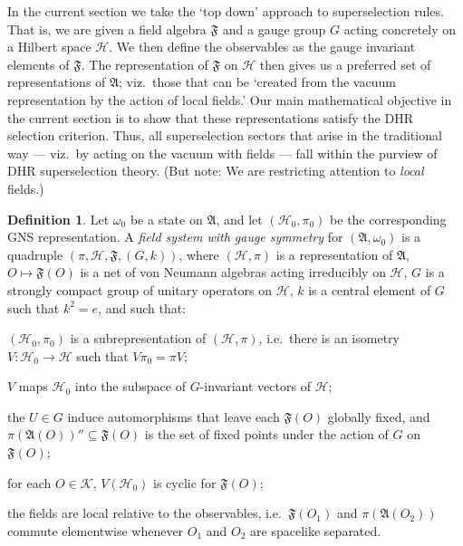 \documentclass[12pt]{article}
\makeatletter
\newenvironment{bxd}%
  {\bigskip\noindent\begin{Sbox}\begin{minipage}{0.9\textwidth} }%
  {\end{minipage}\end{Sbox}\fbox{\TheSbox}\bigskip}%
\newcommand{\alg}[1]{\mathfrak{#1}}
\theoremstyle{definition}
\theoremstyle{definition}
\newtheorem{defn}[thm]{Definition}
\theoremstyle{remark}
\def\2#1{{\mathcal #1}}
\def\al#1{{\mathfrak #1}}
\def\om{\omega} \def\Om{\Omega} \def\dd{\partial} \def\D{\Delta}
\def\@greek#1{%
 \ifcase#1\or$\alpha$\or$\beta$\or$\gamma$\or$\delta$\or$\varepsilon$%
  \or$\zeta$\or$\eta$\or$\vartheta$\or$\iota$\or$\kappa$\or$\lambda$\or$%
  \mu$\or$\nu$\or$\xi$\or$ o$\or$\varpi$\or$\varrho$\or$\varsigma$\or$\tau$%
  \or$\upsilon$\or$\varphi$\or$\chi$\or$\psi$\or$\omega$\else\@ctrerr\fi}
\def\greek#1{\@greek{\csname c@#1\endcsname}}
\newcounter{bean}
\newcommand{\fields}{(\pi ,\2H ,\alg{F},(G,k))}
\makeatother
\begin{document}
In the current section we take the `top down' approach to
superselection rules.  That is, we are given a field algebra $\al F$
and a gauge group $G$ acting concretely on a Hilbert space $\2H$.  We
then define the observables as the gauge invariant elements of $\al
F$.  The representation of $\al F$ on $\2H$ then gives us a preferred
set of representations of $\al A$; viz.\ those that can be `created
from the vacuum representation by the action of local fields.'  Our
main mathematical objective in the current section is to show that
these representations satisfy the DHR selection criterion.  Thus, all
superselection sectors that arise in the traditional way --- viz.\ by
acting on the vacuum with fields --- fall within the purview of DHR
superselection theory.  (But note: We are restricting attention to
\emph{local} fields.)

\begin{bxd} \begin{defn} \label{field-system} Let $\om _0$ be a state
    on $\al A$, and let $(\2H _0,\pi _0 )$ be the corresponding GNS
    representation.  A \emph{field system with gauge symmetry} for
    $(\al A,\om _0)$ is a quadruple $\fields$, where $(\2H ,\pi )$ is
    a representation of $\al A$, $O\mapsto \al F(O)$ is a net of von
    Neumann algebras acting irreducibly on $\2H$, $G$ is a strongly
    compact group of unitary operators on $\2H$, $k$ is a central
    element of $G$ such that $k^2=e$, and such that:
    \begin{list}%
 {\boldmath{\greek{bean})}}{
 \setlength{\rightmargin}{\leftmargin}%
 \setlength{\itemindent}{-1em}  }
\item $(\2H _0,\pi _0)$ is a subrepresentation of $(\2H ,\pi )$, i.e.\
  there is an isometry $V:\2H _0\to \2H$ such that $V\pi _0=\pi V$; 
\item $V$ maps $\2H _0$ into the subspace of $G$-invariant vectors of
  $\2H$;
\item the $U\in G$ induce automorphisms that leave each
  $\al F(O)$ globally fixed, and $\pi (\al
  A(O))''\subseteq \al F(O)$ is the set of fixed points
  under the action of $G$ on $\al F(O)$;
\item for each $O\in \2K$, $V(\2H _0 )$ is cyclic for $\alg{F}(O)$;
\item the fields are local relative to the observables, i.e.\ $\alg{F}(O_1)$ and $\pi
  (\alg{A}(O_2))$ commute elementwise whenever $O_1$ and $O_2$ are spacelike
  separated. \end{list}

\end{defn}
\end{bxd}
\end{document}
